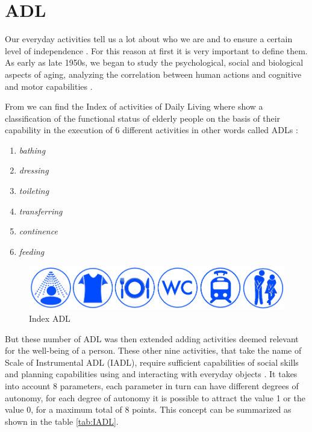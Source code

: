 \documentclass{thesisreport}
\begin{document}
\section{ADL}
Our everyday activities tell us a lot about who we are and to ensure a certain level of independence \cite{buoncompagni2017towards}. For this reason at first it is very important to define them. As early as late 1950s, we began to study the psychological, social and biological aspects of aging, analyzing the correlation between human actions and cognitive and motor capabilities \cite{buoncompagni2017towards}. 

From \cite{Multidisciplinary} we can find the Index of activities of Daily Living where show a classification of the functional status of elderly people on the basis of their capability in the execution of 6 different activities in other words called ADLs \cite{buoncompagni2017towards}:
\begin{enumerate}
    \item \textit{bathing}
    \item \textit{dressing}
    \item \textit{toileting}
    \item \textit{transferring}
    \item \textit{continence}
    \item \textit{feeding}
\end{enumerate}

\begin{figure}[h]
	\centering
	\includegraphics[width=17cm]{Thesis/data/IndexADL.png}
	\caption{Index ADL}
	\label{fig:indexADL}
\end{figure}

But these number of ADL was then extended adding activities deemed relevant for the well-being of a person. These other nine activities, that take the name of Scale of Instrumental ADL \cite{lawton1970assessment} (IADL), require sufficient capabilities of social skills and planning capabilities using and interacting with everyday objects \cite{buoncompagni2017towards}. 
It takes into account 8 parameters, each parameter in turn can have different degrees of autonomy, for each degree of autonomy it is possible to attract the value 1 or the value 0, for a maximum total of 8 points. This concept can be summarized as shown in the table \ref{tab:IADL}. 
\end{document}
